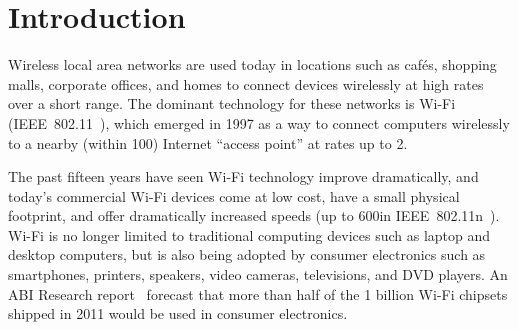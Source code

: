 \ifx\mainfile\undefined

\setcounter{chapter}{0} %
\fi

\cleardoublepage
\chapter{Introduction}
\label{chap:intro}


Wireless local area networks are used today in locations such as caf\'{e}s, shopping malls, corporate offices, and homes to connect devices wirelessly at high rates over a short range. The dominant technology for these networks is Wi-Fi (IEEE~802.11~\cite{80211}), which emerged in 1997 as a way to connect computers wirelessly to a nearby (within 100\m) Internet ``access point'' at rates up to 2\Mbps.

The past fifteen years have seen Wi-Fi technology improve dramatically, and today's commercial Wi-Fi devices come at low cost, have a small physical footprint, and offer dramatically increased speeds (up to 600\Mbps in IEEE~802.11n~\cite{80211n}). Wi-Fi is no longer limited to traditional computing devices such as laptop and desktop computers, but is also being adopted by consumer electronics such as smartphones, printers, speakers, video cameras, televisions, and DVD players. An ABI Research report~\cite{ABI_Research_2010} forecast that more than half of the 1 billion Wi-Fi chipsets shipped in 2011 would be used in consumer electronics.

